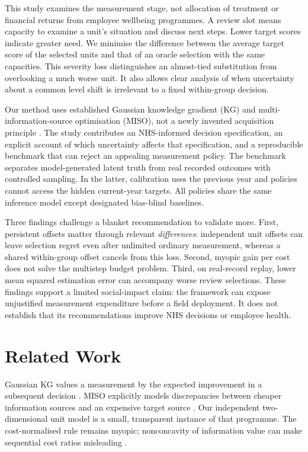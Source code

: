 This study examines the measurement stage, not allocation of treatment or financial returns from employee wellbeing programmes. A review slot means capacity to examine a unit's situation and discuss next steps. Lower target scores indicate greater need. We minimise the difference between the average target score of the selected units and that of an oracle selection with the same capacities. This severity loss distinguishes an almost-tied substitution from overlooking a much worse unit. It also allows clear analysis of when uncertainty about a common level shift is irrelevant to a fixed within-group decision.

Our method uses established Gaussian knowledge gradient (KG) and multi-information-source optimisation (MISO), not a newly invented acquisition principle \citep{frazier2008kg,frazier2009correlated,poloczek2017miso}. The study contributes an NHS-informed decision specification, an explicit account of which uncertainty affects that specification, and a reproducible benchmark that can reject an appealing measurement policy. The benchmark separates model-generated latent truth from real recorded outcomes with controlled sampling. In the latter, calibration uses the previous year and policies cannot access the hidden current-year targets. All policies share the same inference model except designated bias-blind baselines.

Three findings challenge a blanket recommendation to validate more. First, persistent offsets matter through relevant \emph{differences}: independent unit offsets can leave selection regret even after unlimited ordinary measurement, whereas a shared within-group offset cancels from this loss. Second, myopic gain per cost does not solve the multistep budget problem. Third, on real-record replay, lower mean squared estimation error can accompany worse review selections. These findings support a limited social-impact claim: the framework can expose unjustified measurement expenditure before a field deployment. It does not establish that its recommendations improve NHS decisions or employee health.

\section{Related Work}
Gaussian KG values a measurement by the expected improvement in a subsequent decision \citep{frazier2008kg,frazier2009correlated}. MISO explicitly models discrepancies between cheaper information sources and an expensive target source \citep{poloczek2017miso}. Our independent two-dimensional unit model is a small, transparent instance of that programme. The cost-normalised rule remains myopic; nonconcavity of information value can make sequential cost ratios misleading \citep{frazier2010paradoxes}.

